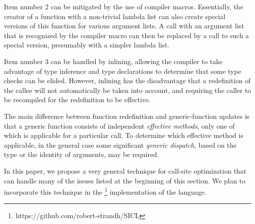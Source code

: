 Item number 2 can be mitigated by the use of compiler macros.
Essentially, the creator of a function with a non-trivial lambda list
can also create special versions of this function for various argument
lists.  A call with an argument list that is recognized by the
compiler macro can then be replaced by a call to such a special
version, presumably with a simpler lambda list.

Item number 3 can be handled by inlining, allowing the compiler to
take advantage of type inference and type declarations to determine
that some type checks can be elided.  However, inlining has the
disadvantage that a redefinition of the callee will not automatically
be taken into account, and requiring the caller to be recompiled for
the redefinition to be effective.

The main difference between function redefinition and generic-function
updates is that a generic function consists of independent
\emph{effective methods}, only one of which is applicable for a
particular call.  To determine which effective method is applicable,
in the general case some significant \emph{generic dispatch}, based on
the type or the identity of arguments, may be required.

In this paper, we propose a very general technique for call-site
optimization that can handle many of the issues listed at the
beginning of this section.  We plan to incorporate this technique in
the \sicl{}%
\footnote{https://github.com/robert-strandh/SICL}
implementation of the \commonlisp{} language.

